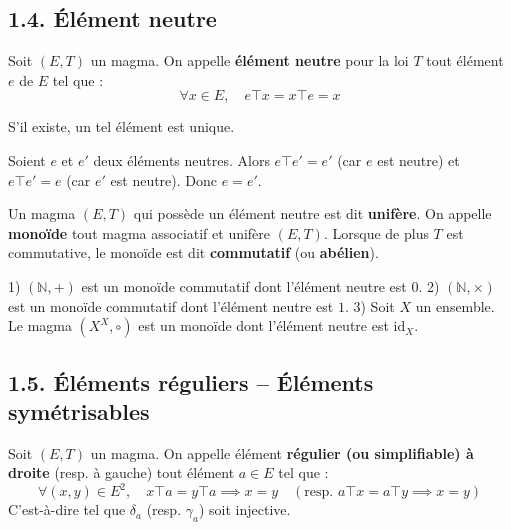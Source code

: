 \documentclass[a4paper,11pt]{article}
\newcommand{\N}{\mathbb{N}}
\newcommand{\mot}[1]{\textcolor{bordeaux}{\textbf{#1}}}
\begin{document}
\subsection{1.4. Élément neutre}

\begin{definition}
Soit $(E, T)$ un magma. On appelle \mot{élément neutre} pour la loi $T$ tout élément $e$ de $E$ tel que :
\[
\forall x \in E, \quad e \top x = x \top e = x
\]
\end{definition}

\begin{proposition}
S'il existe, un tel élément est unique.
\end{proposition}

\begin{demonstration}
Soient $e$ et $e'$ deux éléments neutres. Alors $e \top e' = e'$ (car $e$ est neutre) et $e \top e' = e$ (car $e'$ est neutre). Donc $e = e'$.
\end{demonstration}

\begin{definition}
Un magma $(E, T)$ qui possède un élément neutre est dit \mot{unifère}.
On appelle \mot{monoïde} tout magma associatif et unifère $(E, T)$. 
Lorsque de plus $T$ est commutative, le monoïde est dit \mot{commutatif} (ou \mot{abélien}).
\end{definition}

\begin{exemples}
1) $(\N, +)$ est un monoïde commutatif dont l'élément neutre est $0$.
2) $(\N, \times)$ est un monoïde commutatif dont l'élément neutre est $1$.
3) Soit $X$ un ensemble. Le magma $(X^X, \circ)$ est un monoïde dont l'élément neutre est $\text{id}_X$.
\end{exemples}

\subsection{1.5. Éléments réguliers -- Éléments symétrisables}

\begin{definition}
Soit $(E, T)$ un magma. On appelle élément \mot{régulier (ou simplifiable) à droite} (resp. à gauche) tout élément $a \in E$ tel que :
\[
\forall (x,y) \in E^2, \quad x \top a = y \top a \implies x = y \quad (\text{resp. } a \top x = a \top y \implies x = y)
\]
C'est-à-dire tel que $\delta_a$ (resp. $\gamma_a$) soit injective.
\end{definition}
\end{document}
